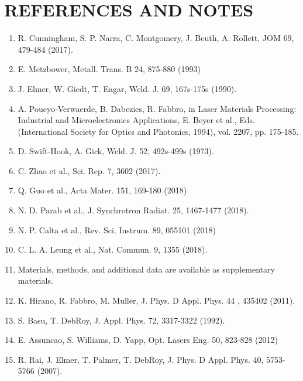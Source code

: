 \documentclass[10pt]{article}
\begin{document}
\section*{REFERENCES AND NOTES}
\begin{enumerate}
  \item R. Cunningham, S. P. Narra, C. Montgomery, J. Beuth, A. Rollett, JOM 69, 479-484 (2017).

  \item E. Metzbower, Metall. Trans. B 24, 875-880 (1993)

  \item J. Elmer, W. Giedt, T. Eagar, Weld. J. 69, 167s-175s (1990).

  \item A. Poueyo-Verwaerde, B. Dabezies, R. Fabbro, in Laser Materials Processing: Industrial and Microelectronics Applications, E. Beyer et al., Eds. (International Society for Optics and Photonics, 1994), vol. 2207, pp. 175-185.

  \item D. Swift-Hook, A. Gick, Weld. J. 52, 492s-499s (1973).

  \item C. Zhao et al., Sci. Rep. 7, 3602 (2017).

  \item Q. Guo et al., Acta Mater. 151, 169-180 (2018)

  \item N. D. Parab et al., J. Synchrotron Radiat. 25, 1467-1477 (2018).

  \item N. P. Calta et al., Rev. Sci. Instrum. 89, 055101 (2018)

  \item C. L. A. Leung et al., Nat. Commun. 9, 1355 (2018).

  \item Materials, methods, and additional data are available as supplementary materials.

  \item K. Hirano, R. Fabbro, M. Muller, J. Phys. D Appl. Phys. 44 , 435402 (2011).

  \item S. Basu, T. DebRoy, J. Appl. Phys. 72, 3317-3322 (1992).

  \item E. Assuncao, S. Williams, D. Yapp, Opt. Lasers Eng. 50, 823-828 (2012)

  \item R. Rai, J. Elmer, T. Palmer, T. DebRoy, J. Phys. D Appl. Phys. 40, 5753-5766 (2007).


\end{enumerate}
\end{document}
